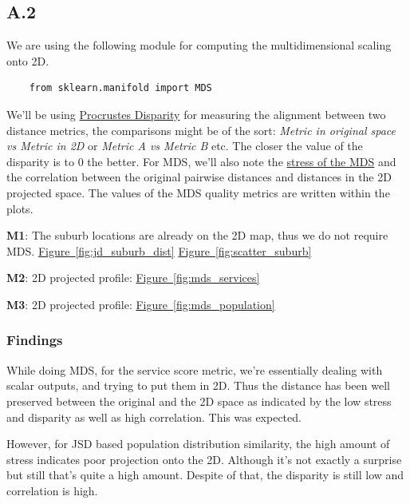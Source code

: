 \documentclass[
	a4paper, %
	10pt, %
	unnumberedsections, %
	twoside, %
]{LTJournalArticle}
\begin{document}
\subsection{A.2}

We are using the following module for computing the multidimensional scaling onto 2D.
\begin{verbatim}
    from sklearn.manifold import MDS
\end{verbatim}

We'll be using \href{https://en.wikipedia.org/wiki/Procrustes_analysis}{Procrustes Disparity} for measuring the alignment between two distance metrics, the comparisons might be of the sort: \textit{Metric in original space vs Metric in 2D} or \textit{Metric A vs Metric B} etc. The closer the value of the disparity is to 0 the better. For MDS, we'll also note the \href{https://imaging.mrc-cbu.cam.ac.uk/statswiki/FAQ/mds/stress#:~:text=The%20measure%20of%20goodness%20of,or%20more%20estimated%20stimuli%20dimensions}{stress of the MDS} and the correlation between the original pairwise distances and distances in the 2D projected space. The values of the MDS quality metrics are written within the plots.

\textbf{M1}: The suburb locations are already on the 2D map, thus we do not require MDS.  \hyperref[sub@fig:jd_suburb_dist]{Figure~\ref{fig:jd_suburb_dist}} \hyperref[sub@fig:scatter_suburb]{Figure~\ref{fig:scatter_suburb}}

\textbf{M2}: 2D projected profile: \hyperref[sub@fig:mds_services]{Figure~\ref{fig:mds_services}}

\textbf{M3}: 2D projected profile: \hyperref[sub@fig:mds_population]{Figure~\ref{fig:mds_population}}




\subsubsection{Findings}

While doing MDS, for the service score metric, we're essentially dealing with scalar outputs, and trying to put them in 2D. Thus the distance has been well preserved between the original and the 2D space as indicated by the low stress and disparity as well as high correlation. This was expected.

However, for JSD based population distribution similarity, the high amount of stress indicates poor projection onto the 2D. Although it's not exactly a surprise but still that's quite a high amount. Despite of that, the disparity is still low and correlation is high. 
\end{document}
